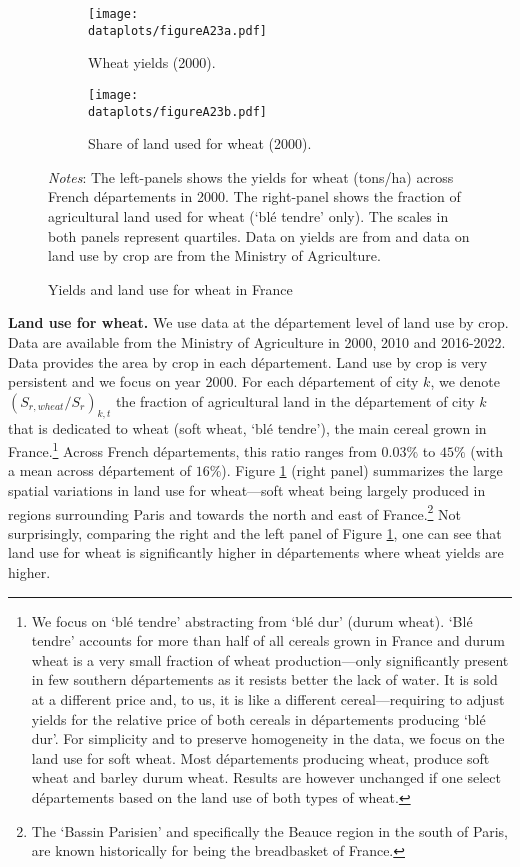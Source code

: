 \documentclass[11pt]{report}
\newcommand{\dataplots}{../output/data/plots}
\begin{document}
\begin{figure}[h]
	\begin{adjustbox}{center}	
		\begin{subfigure}{0.6\textwidth}
			\texttt{[image: \\dataplots/figureA23a.pdf]}
			\caption{Wheat yields (2000).}
		\end{subfigure}
		\hspace{-1cm}
		\begin{subfigure}{0.6\textwidth}
			\texttt{[image: \\dataplots/figureA23b.pdf]}
			\caption{Share of land used for wheat (2000).}
		\end{subfigure}	
	\end{adjustbox}		
	\caption{Yields and land use for wheat in France\label{A-fig:wheat}}
	{\footnotesize \textit{Notes}: The left-panels shows the yields for wheat (tons/ha) across French départements in 2000. The right-panel shows the fraction of agricultural land used for wheat (`blé tendre' only). The scales in both panels represent quartiles. Data on yields are from \cite{schaubergeretal2022} and data on land use by crop are from the Ministry of Agriculture.}
\end{figure}

\noindent \textbf{Land use for wheat.} We use data at the département level of land use by crop. Data are available from the Ministry of Agriculture in 2000, 2010 and 2016-2022. Data provides the area by crop in each département. Land use by crop is very persistent and we focus on year 2000. For each département of city $k$, we denote $(S_{r,wheat}/S_r)_{k,t}$ the fraction of agricultural land in the département of city $k$ that is dedicated to wheat (soft wheat, `blé tendre'), the main cereal grown in France.\footnote{We focus on `blé tendre' abstracting from `blé dur' (durum wheat). `Blé tendre' accounts for more than half of all cereals grown in France and durum wheat is a very small fraction of wheat production---only significantly present in few southern départements as it resists better the lack of water. It is sold at a different price and, to us, it is like a different cereal---requiring to adjust yields for the relative price of both cereals in départements producing `blé dur'. For simplicity and to preserve homogeneity in the data, we focus on the land use for soft wheat. Most départements producing wheat, produce soft wheat and barley durum wheat. Results are however unchanged if one select départements based on the land use of both types of wheat.} Across French départements, this ratio ranges from $0.03\%$ to $45\%$ (with a mean across département of $16\%$). Figure \ref{A-fig:wheat} (right panel) summarizes the large spatial variations in land use for wheat---soft wheat being largely produced in regions surrounding Paris and towards the north and east of France.\footnote{The `Bassin Parisien' and specifically the Beauce region in the south of Paris, are known historically for being the breadbasket of France.} Not surprisingly, comparing the right and the left panel of Figure \ref{A-fig:wheat}, one can see that land use for wheat is significantly higher in départements where wheat yields are higher. 
\end{document}
